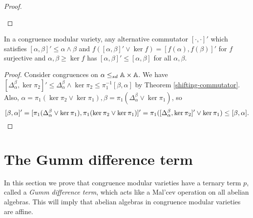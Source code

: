 \begin{appendices}
\begin{proof}
\begin{center}
\end{center}
\end{proof}

\begin{thm} In a congruence modular variety, any alternative commutator $[\cdot,\cdot]'$ which satisfies $[\alpha,\beta]' \le \alpha \wedge \beta$ and $f([\alpha,\beta]'\vee \ker f) = [f(\alpha),f(\beta)]'$ for $f$ surjective and $\alpha,\beta \ge \ker f$ has $[\alpha,\beta]' \le [\alpha,\beta]$ for all $\alpha, \beta$.
\end{thm}
\begin{proof} Consider congruences on $\alpha \le_{sd} \mathbb{A}\times \mathbb{A}$. We have $[\Delta_\alpha^\beta,\ker \pi_2]' \le \Delta_\alpha^\beta\wedge \ker \pi_2 \le \pi_1^{-1}[\beta,\alpha]$ by Theorem \ref{shifting-commutator}. Also, $\alpha = \pi_1(\ker \pi_2 \vee \ker \pi_1), \beta = \pi_1(\Delta_\alpha^\beta \vee \ker \pi_1)$, so
\[
[\beta,\alpha]' = [\pi_1(\Delta_\alpha^\beta \vee \ker \pi_1), \pi_1(\ker \pi_2 \vee \ker \pi_1)]' = \pi_1([\Delta_\alpha^\beta, \ker \pi_2]' \vee \ker \pi_1) \le [\beta,\alpha].\qedhere
\]
\end{proof}


\section{The Gumm difference term}

In this section we prove that congruence modular varieties have a ternary term $p$, called a \emph{Gumm difference term}, which acts like a Mal'cev operation on all abelian algebras. This will imply that abelian algebras in congruence modular varieties are affine.


\end{appendices}
